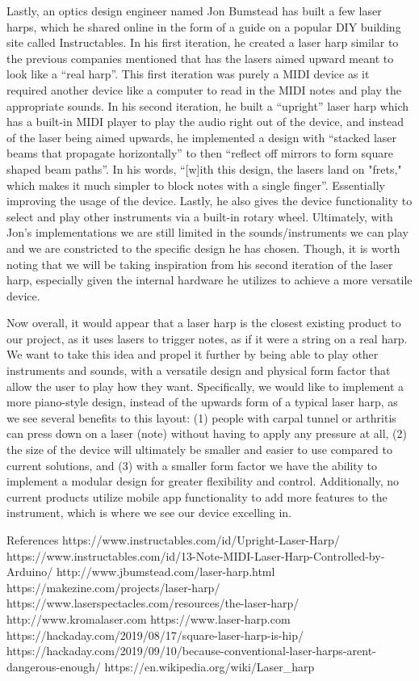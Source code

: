 Lastly, an optics design engineer named Jon Bumstead has built a few laser harps, which he shared online in the form of a guide on a popular DIY building site called Instructables. In his first iteration, he created a laser harp similar to the previous companies mentioned that has the lasers aimed upward meant to look like a “real harp”. This first iteration was purely a MIDI device as it required another device like a computer to read in the MIDI notes and play the appropriate sounds. In his second iteration, he built a “upright” laser harp which has a built-in MIDI player to play the audio right out of the device, and instead of the laser being aimed upwards, he implemented a design with “stacked laser beams that propagate horizontally” to then “reflect off mirrors to form square shaped beam paths”. In his words, “[w]ith this design, the lasers land on "frets," which makes it much simpler to block notes with a single finger”. Essentially improving the usage of the device. Lastly, he also gives the device functionality to select and play other instruments via a built-in rotary wheel. Ultimately, with Jon’s implementations we are still limited in the sounds/instruments we can play and we are constricted to the specific design he has chosen. Though, it is worth noting that we will be taking inspiration from his second iteration of the laser harp, especially given the internal hardware he utilizes to achieve a more versatile device.

Now overall, it would appear that a laser harp is the closest existing product to our project, as it uses lasers to trigger notes, as if it were a string on a real harp. We want to take this idea and propel it further by being able to play other instruments and sounds, with a versatile design and physical form factor that allow the user to play how they want. Specifically, we would like to implement a more piano-style design, instead of the upwards form of a typical laser harp, as we see several benefits to this layout: (1) people with carpal tunnel or arthritis can press down on a laser (note) without having to apply any pressure at all, (2) the size of the device will ultimately be smaller and easier to use compared to current solutions, and (3) with a smaller form factor we have the ability to implement a modular design for greater flexibility and control. Additionally, no current products utilize mobile app functionality to add more features to the instrument, which is where we see our device excelling in.

References
https://www.instructables.com/id/Upright-Laser-Harp/
https://www.instructables.com/id/13-Note-MIDI-Laser-Harp-Controlled-by-Arduino/
http://www.jbumstead.com/laser-harp.html
https://makezine.com/projects/laser-harp/
https://www.laserspectacles.com/resources/the-laser-harp/
http://www.kromalaser.com
https://www.laser-harp.com
https://hackaday.com/2019/08/17/square-laser-harp-is-hip/
https://hackaday.com/2019/09/10/because-conventional-laser-harps-arent-dangerous-enough/
https://en.wikipedia.org/wiki/Laser_harp
